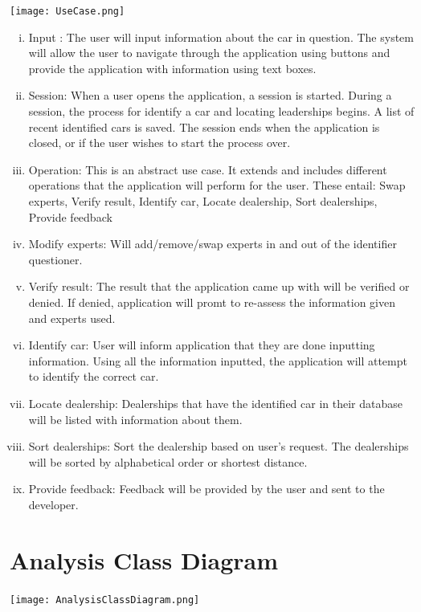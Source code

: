 \documentclass[12pt]{article}
\begin{document}
	\texttt{[image: UseCase.png]}
	\begin{enumerate}[i)]
	\item Input : The user will input information about the car in question. The system will allow the user to navigate through the application using buttons and provide the application with information using text boxes.

	\item Session: When a user opens the application, a session is started. During a session, the process for identify a car and locating leaderships begins. A list of recent identified cars is saved. The session ends when the application is closed, or if the user wishes to start the process over.

	\item Operation: This is an abstract use case. It extends and includes different operations that the application will perform for the user. These entail: Swap experts, Verify result, Identify car, Locate dealership, Sort dealerships, Provide feedback

	\item Modify experts: Will add/remove/swap experts in and out of the identifier questioner.

	\item Verify result: The result that the application came up with will be verified or denied. If denied, application will promt to re-assess the information given and experts used.

	\item Identify car: User will inform application that they are done inputting information. Using all the information inputted, the application will attempt to identify the correct car.

	\item Locate dealership: Dealerships that have the identified car in their database will be listed with information about them.

	\item Sort dealerships: Sort the dealership based on user's request. The dealerships will be sorted by alphabetical order or shortest distance.

	\item Provide feedback: Feedback will be provided by the user and sent to the developer.

	\end{enumerate}

\section{Analysis Class Diagram}
\label{sec:analysis_class_diagram}
\texttt{[image: AnalysisClassDiagram.png]}
\end{document}
